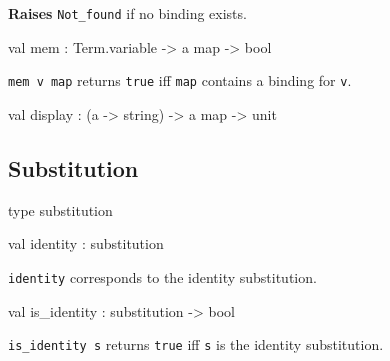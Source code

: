 \begin{ocamldocsigend}
\begin{ocamldocdescription}
{\bf Raises} {\tt{Not\_found}} if no binding exists.


\end{ocamldocdescription}


\label{val:Term.VariableMap.mem}\begin{ocamldoccode}
val mem : Term.variable -> {\textquotesingle}a map -> bool
\end{ocamldoccode}
\begin{ocamldocdescription}
{\tt{mem v map}} returns {\tt{true}} iff {\tt{map}} contains a binding for {\tt{v}}.


\end{ocamldocdescription}


\label{val:Term.VariableMap.display}\begin{ocamldoccode}
val display : ({\textquotesingle}a -> string) -> {\textquotesingle}a map -> unit
\end{ocamldoccode}
\end{ocamldocsigend}






\subsection{Substitution}




\label{type:Term.substitution}\begin{ocamldoccode}
type substitution 
\end{ocamldoccode}




\label{val:Term.identity}\begin{ocamldoccode}
val identity : substitution
\end{ocamldoccode}
\begin{ocamldocdescription}
{\tt{identity}} corresponds to the identity substitution.


\end{ocamldocdescription}




\label{val:Term.is-underscoreidentity}\begin{ocamldoccode}
val is_identity : substitution -> bool
\end{ocamldoccode}
\begin{ocamldocdescription}
{\tt{is\_identity s}} returns {\tt{true}} iff {\tt{s}} is the identity substitution.


\end{ocamldocdescription}




